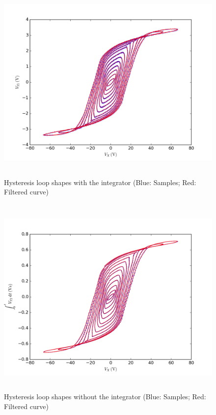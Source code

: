 \documentclass[a4paper]{scrartcl}
\begin{document}
\begin{figure}
    \centering
    \includegraphics[height = 10cm]{with-integrator.png}
    \caption{Hysteresis loop shapes with the integrator (Blue: Samples; Red: Filtered curve)}
    \label{fig:with-integrator}
\end{figure}

\begin{figure}
    \centering
    \includegraphics[height = 10cm]{without-integrator.png}
    \caption{Hysteresis loop shapes without the integrator (Blue: Samples; Red: Filtered curve)}
    \label{fig:without-integrator}
\end{figure}
\end{document}
